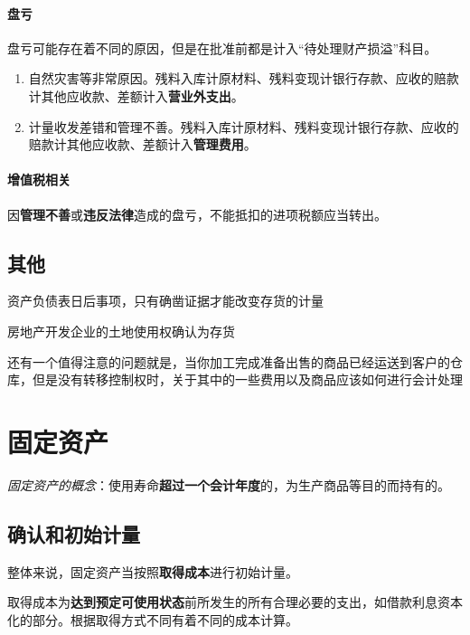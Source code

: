 \documentclass[UTF8,12pt]{ctexart}
\numberwithin{equation}{section} %
\numberwithin{figure}{section}
\numberwithin{table}{section}
\begin{document}
	
	\paragraph{盘亏} 盘亏可能存在着不同的原因，但是在批准前都是计入“待处理财产损溢”科目。
	\begin{enumerate}
		\item 自然灾害等非常原因。残料入库计原材料、残料变现计银行存款、应收的赔款计其他应收款、差额计入\textbf{营业外支出}。
		
		\item 计量收发差错和管理不善。残料入库计原材料、残料变现计银行存款、应收的赔款计其他应收款、差额计入\textbf{管理费用}。
		
	\end{enumerate}
	
	\paragraph{增值税相关}
	因\textbf{管理不善}或\textbf{违反法律}造成的盘亏，不能抵扣的进项税额应当转出。
	
	\subsection{其他}
	资产负债表日后事项，只有确凿证据才能改变存货的计量
	
	房地产开发企业的土地使用权确认为存货
	
	还有一个值得注意的问题就是，当你加工完成准备出售的商品已经运送到客户的仓库，但是没有转移控制权时，关于其中的一些费用以及商品应该如何进行会计处理    
	
	\newpage
	\section{固定资产}
	\textit{固定资产的概念}：使用寿命\textbf{超过一个会计年度}的，为生产商品等目的而持有的。
	
	\subsection{确认和初始计量}
	
	整体来说，固定资产当按照\textbf{取得成本}进行初始计量。
	
	取得成本为\textbf{达到预定可使用状态}前所发生的所有合理必要的支出，如借款利息资本化的部分。根据取得方式不同有着不同的成本计算。
	
\end{document}
